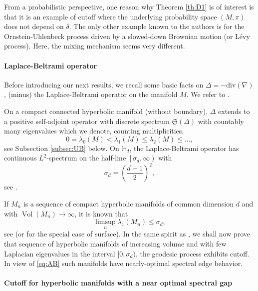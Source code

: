 \documentclass[]{scrartcl}
\newcommand{\dH}{\mathds H}
\DeclareMathOperator{\Vol}{Vol}
\numberwithin{equation}{section}
\numberwithin{figure}{section}
\begin{document}
From a probabilistic perspective, one reason why Theorem \ref{th:D1} is of interest is that it is an example of cutoff where the underlying probability space $(M,\pi)$ does not depend on $\delta$. The only other example known to the authors is \cite{10.1214/20-EJP417} for the Ornstein-Uhlenbeck process driven by a slowed-down Brownian motion (or Lévy process). Here, the mixing mechanism seems very different.





\paragraph{Laplace-Beltrami operator} Before introducing our next results, we recall some basic facts on $\Delta = - \mathrm{div} (\nabla)$, (minus) the Laplace-Beltrami operator on the manifold $M$. We refer to \cite{Stri,Buser, Chavel}. 	

	 On a compact connected hyperbolic manifold (without boundary), $\Delta$ extends to a positive self-adjoint operator with  discrete spectrum $\mathfrak S(\Delta)$ with countably many eigenvalues which we denote,  counting multiplicities, 
	 $$0 = \lambda_0(M) <\lambda_1 (M) \leq \lambda_2 (M) \leq  \dots,$$
see Subsection \ref{subsec:UB} below. 
On $\dH_d$,  the Laplace-Beltrami operator has continuous $L^2$-spectrum on the half-line
$ \left[ \sigma_d  , \infty \right)$ with 
\begin{equation}\label{eq:defsigmad}
\sigma_d =  \left(\frac{d-1}{2} \right)^2,
\end{equation} see \cite{10.4310/jdg/1214429509}.
	
 If $M_n$ is a sequence of compact hyperbolic manifolds of common dimension $d$ and with $\Vol(M_n) \to \infty$, it is known that 
	\begin{equation}\label{eq:AB}
\limsup_n	\lambda_1 (M_n) \leq \sigma_d,
	\end{equation}
see \cite[Corollary 2.3]{Cheng1975} (or \cite{MR365408} for the special case of surface).
	In the same spirit as \cite{MR3558308,Golubev,MR4167012,MR4476123,MR4400017}, we shall now prove that sequence of hyperbolic manifolds of increasing volume and with few Laplacian eigenvalues in the interval $[0, \sigma_d)$, the geodesic process exhibits cutoff.	In view of \eqref{eq:AB} such manifolds have nearly-optimal spectral edge behavior.

\paragraph{Cutoff for hyperbolic manifolds with a near optimal spectral gap}
\end{document}
